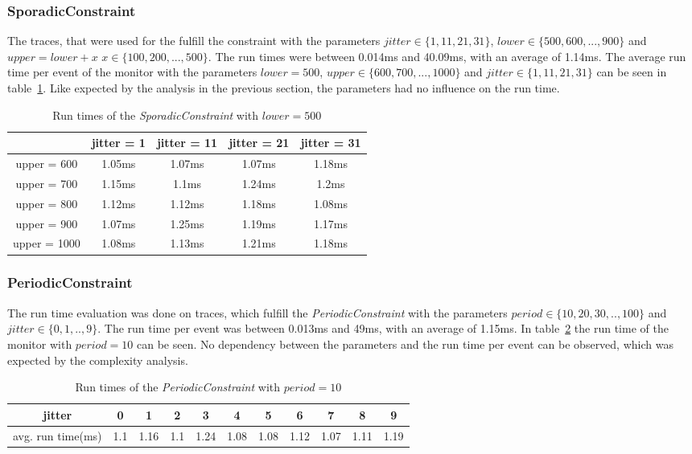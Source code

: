 \subsubsection{SporadicConstraint}
The traces, that were used for the fulfill the constraint with the parameters $jitter\in\{1,11,21,31\}$, $lower\in\{500,600,...,900\}$ and $upper=lower+x$ $x\in\{100, 200, ..., 500\}$. The run times were between 0.014ms and 40.09ms, with an average of 1.14ms. The average run time per event of the monitor with the parameters $lower=500$, $upper\in\{600,700,...,1000\}$ and $jitter\in\{1,11,21,31\}$ can be seen in table~\ref{tab:runtimeSporadicConstraint}. Like expected by the analysis in the previous section, the parameters had no influence on the run time.

\begin{table}
	\begin{tabular}{|c|c|c|c|c|}
		\hline
		& jitter = 1 & jitter = 11 & jitter = 21 & jitter = 31\\
		\hline
		upper = 600 & 1.05ms & 1.07ms& 1.07ms& 1.18ms\\
		\hline
		upper = 700 & 1.15ms & 1.1ms& 1.24ms& 1.2ms\\
		\hline
		upper = 800 & 1.12ms& 1.12ms& 1.18ms & 1.08ms\\
		\hline
		upper = 900 & 1.07ms& 1.25ms& 1.19ms& 1.17ms\\
		\hline
		upper = 1000 & 1.08ms& 1.13ms& 1.21ms& 1.18ms\\
		\hline
	\end{tabular}
	\centering
	\caption{Run times of the \textit{SporadicConstraint} with $lower = 500$}
	\label{tab:runtimeSporadicConstraint}
\end{table}

\subsubsection{PeriodicConstraint}
The run time evaluation was done on traces, which fulfill the \textit{PeriodicConstraint} with the parameters $period\in\{10,20,30,..,100\}$ and $jitter\in\{0,1,..,9\}$. The run time per event was between 0.013ms and 49ms, with an average of 1.15ms. In table~\ref{tab:runtimePeriodicConstraint} the run time of the monitor with $period = 10$ can be seen. No dependency between the parameters and the run time per event can be observed, which was expected by the complexity analysis.
\begin{table}
	\begin{tabular}{|c|c|c|c|c|c|c|c|c|c|c|}
		\hline
		jitter & 0& 1& 2& 3& 4& 5& 6& 7& 8& 9\\
		\hline
		avg. run time(ms) &1.1& 1.16& 1.1&1.24&1.08&1.08&1.12&1.07&1.11&1.19\\
		\hline
	\end{tabular}
	\centering
	\caption{Run times of the \textit{PeriodicConstraint} with $period = 10$}
	\label{tab:runtimePeriodicConstraint}
\end{table}

